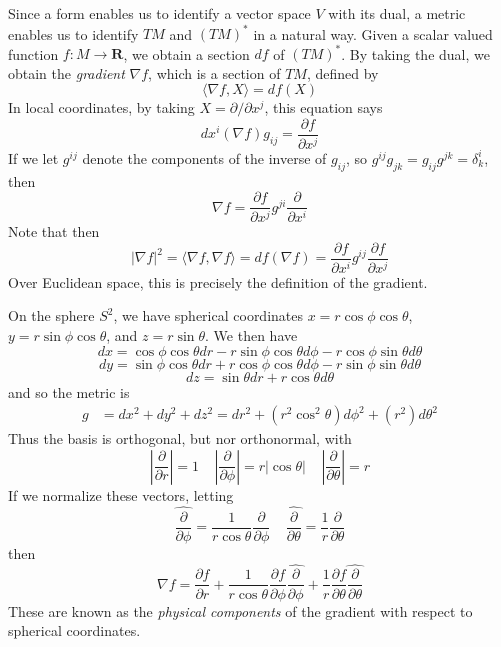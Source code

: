 Since a form enables us to identify a vector space $V$ with its dual, a metric enables us to identify $TM$ and $(TM)^*$ in a natural way. Given a scalar valued function $f: M \to \mathbf{R}$, we obtain a section $df$ of $(TM)^*$. By taking the dual, we obtain the \emph{gradient} $\nabla f$, which is a section of $TM$, defined by
%
\[ \langle \nabla f, X \rangle = df(X) \]
%
In local coordinates, by taking $X = \partial/\partial x^j$, this equation says
%
\[ dx^i(\nabla f) g_{ij} = \frac{\partial f}{\partial x^j} \]
%
If we let $g^{ij}$ denote the components of the inverse of $g_{ij}$, so $g^{ij} g_{jk} = g_{ij} g^{jk} = \delta^i_k$,  then
%
\[ \nabla f = \frac{\partial f}{\partial x^j} g^{ji} \frac{\partial}{\partial x^i} \]
%
Note that then
%
\[ |\nabla f|^2 = \langle \nabla f, \nabla f \rangle = df(\nabla f) = \frac{\partial f}{\partial x^i} g^{ij} \frac{\partial f}{\partial x^j} \]
%
Over Euclidean space, this is precisely the definition of the gradient.

\begin{example}
    On the sphere $S^2$, we have spherical coordinates $x = r \cos \phi \cos \theta$, $y = r \sin \phi \cos \theta$, and $z = r \sin \theta$. We then have
    \[ dx = \cos \phi \cos \theta dr - r \sin \phi \cos \theta d \phi - r \cos \phi \sin \theta d\theta \]
    \[ dy = \sin \phi \cos \theta dr + r \cos \phi \cos \theta d \phi - r \sin \phi \sin \theta d \theta \]
    \[ dz = \sin \theta dr + r \cos \theta d \theta \]
    and so the metric is
    \begin{align*}
        g &= dx^2 + dy^2 + dz^2 = dr^2 + (r^2 \cos^2 \theta) d\phi^2 + (r^2) d\theta^2
    \end{align*}
    Thus the basis is orthogonal, but nor orthonormal, with
    \[ \left|\frac{\partial}{\partial r} \right| = 1\ \ \ \ \ \left|\frac{\partial}{\partial \phi}\right| = r |\cos \theta|\ \ \ \ \ \left|\frac{\partial}{\partial \theta}\right| = r \]
    If we normalize these vectors, letting
    \[ \widehat{\frac{\partial}{\partial \phi}} = \frac{1}{r \cos \theta} \frac{\partial}{\partial \phi}\ \ \ \ \ \widehat{\frac{\partial}{\partial \theta}} = \frac{1}{r} \frac{\partial}{\partial \theta} \]
    then
    \[ \nabla f = \frac{\partial f}{\partial r} + \frac{1}{r \cos \theta} \frac{\partial f}{\partial \phi} \widehat{\frac{\partial}{\partial \phi}} + \frac{1}{r} \frac{\partial f}{\partial \theta} \widehat{\frac{\partial}{\partial \theta}} \]
    These are known as the {\it physical components} of the gradient with respect to spherical coordinates.
\end{example}

